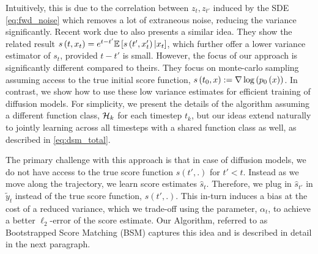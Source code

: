Intuitively, this is due to the correlation between $z_{t}, z_{t
'}$ induced by the SDE \eqref{eq:fwd_noise} which removes a lot of extraneous noise, reducing the variance significantly. Recent work due to \cite{de2024target} also presents a similar idea. They show the related result $ s\left(t, x_t\right) = e^{t-t'}\mathbb{E}\left[s\left(t', x_t'\right)|x_t\right]$, which further offer a lower variance estimator of $s_t$, provided $t-t'$ is small. However, the focus of our approach is significantly different compared to theirs. They focus on monte-carlo sampling assuming access to the true initial score function, $s\left(t_{0}, x\right) := \nabla\log\left(p_{0}\left(x\right)\right)$. In contrast, we show how to use these low variance estimates for efficient training of diffusion models. For simplicity, we present the details of the algorithm assuming a different function class, $\mathcal{H}_{k}$ for each timestep $t_{k}$, but our ideas extend naturally to jointly learning across all timesteps with a shared function class as well, as described in \eqref{eq:dsm_total}.





The primary challenge with this approach is that in case of diffusion models, we do not have access to the true score function $s(t',.)$ for $t' < t$. Instead as we move along the trajectory, we learn score estimates $\hat{s}_{t}$. Therefore, we plug in $\hat{s}_{t'}$ in $\tilde{y}_{t}$ instead of the true score function, $s(t',.)$. This in-turn induces a bias at the cost of a reduced variance, which we trade-off using the parameter, $\alpha_t$, to achieve a better $\ell_2$-error of the score estimate. Our Algorithm, referred to as Bootstrapped Score Matching (BSM) captures this idea and is described in detail in the next paragraph. 

